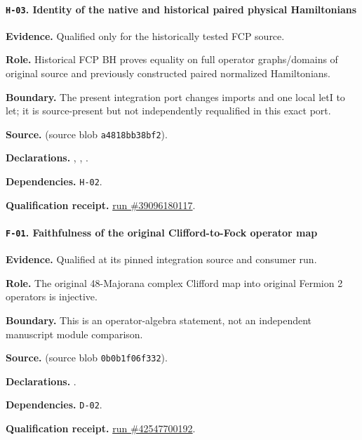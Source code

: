 \paragraph{\texttt{H-03}. Identity of the native and historical paired physical Hamiltonians}
\noindent\textbf{Evidence.} Qualified only for the historically tested FCP source.
\par\noindent\textbf{Role.} Historical FCP BH proves equality on full operator graphs/domains of original source and previously constructed paired normalized Hamiltonians.
\par\noindent\textbf{Boundary.} The present integration port changes imports and one local letI to let; it is source-present but not independently requalified in this exact port.
\par\noindent\textbf{Source.}  (source blob \texttt{a4818bb38bf2}).
\par\noindent\textbf{Declarations.} , , .
\par\noindent\textbf{Dependencies.} \texttt{H-02}.
\par\noindent\textbf{Qualification receipt.} \href{https://github.com/etblink/Foundational-Convergence-Program/actions/runs/39096180117}{run \#39096180117}.
\medskip

\paragraph{\texttt{F-01}. Faithfulness of the original Clifford-to-Fock operator map}
\noindent\textbf{Evidence.} Qualified at its pinned integration source and consumer run.
\par\noindent\textbf{Role.} The original 48-Majorana complex Clifford map into original Fermion 2 operators is injective.
\par\noindent\textbf{Boundary.} This is an operator-algebra statement, not an independent manuscript module comparison.
\par\noindent\textbf{Source.}  (source blob \texttt{0b0b1f06f332}).
\par\noindent\textbf{Declarations.} .
\par\noindent\textbf{Dependencies.} \texttt{D-02}.
\par\noindent\textbf{Qualification receipt.} \href{https://github.com/etblink/math/actions/runs/42547700192}{run \#42547700192}.
\medskip

